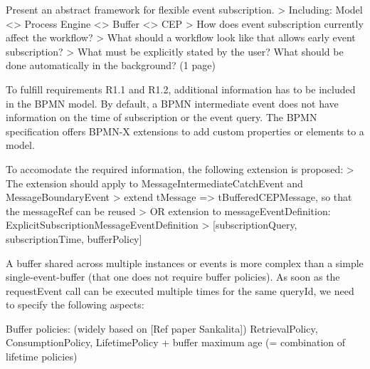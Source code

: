 Present an abstract framework for flexible event subscription.
> Including: Model <> Process Engine <> Buffer <> CEP
> How does event subscription currently affect the workflow?
> What should a workflow look like that allows early event subscription?
> What must be explicitly stated by the user? What should be done automatically in the background?
(1 page)

To fulfill requirements R1.1 and R1.2, additional information has to be included in the BPMN model. By default, a BPMN intermediate event does not have information on the time of subscription or the event query. 
The BPMN specification offers BPMN-X extensions to add custom properties or elements to a model.

To accomodate the required information, the following extension is proposed:
> The extension should apply to MessageIntermediateCatchEvent and MessageBoundaryEvent
> extend tMessage => tBufferedCEPMessage, so that the messageRef can be reused
> OR extension to messageEventDefinition: ExplicitSubscriptionMessageEventDefinition
> [subscriptionQuery, subscriptionTime, bufferPolicy]

A buffer shared across multiple instances or events is more complex than a simple single-event-buffer (that one does not require buffer policies). As soon as the requestEvent call can be executed multiple times for the same queryId, we need to specify the following aspects:

Buffer policies:
(widely based on [Ref paper Sankalita]) RetrievalPolicy, ConsumptionPolicy, LifetimePolicy
+ buffer maximum age (= combination of lifetime policies)

